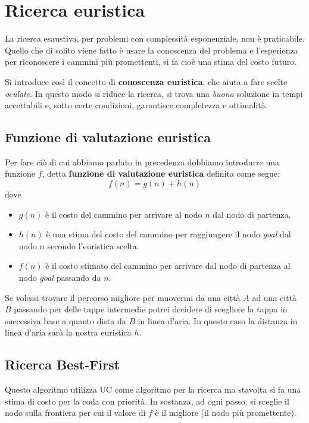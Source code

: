 \chapter{Ricerca euristica} \label{chapter: euristica}
La ricerca esaustiva, per problemi con complessit\`a esponenziale, non \`e praticabile.
Quello che di solito viene fatto \`e usare la conoscenza del problema e l'esperienza
per riconoscere i cammini pi\`u promettenti, si fa cio\`e una stima del costo futuro.

Si introduce cos\`i il concetto di \textbf{conoscenza euristica}, che aiuta a fare scelte
\emph{oculate}. In questo modo si riduce la ricerca, si trova una \emph{buona} soluzione
in tempi accettabili e, sotto certe condizioni, garantisce completezza e ottimalit\`a.

\section{Funzione di valutazione euristica}
Per fare ci\`o di cui abbiamo parlato in precedenza dobbiamo introdurre una funzione
$f$, detta \textbf{funzione di valutazione euristica} definita come segue:
\[ f(n) = g(n) + h(n) \]
dove
\begin{itemize}
	\item $g(n)$ \`e il costo del cammino per arrivare al nodo $n$ dal nodo di partenza.
	\item $h(n)$ \`e una stima del costo del cammino per raggiungere il nodo \emph{goal}
	      dal nodo $n$ secondo l'euristica scelta.
	\item $f(n)$ \`e il costo stimato del cammino per arrivare dal nodo di partenza
	      al nodo \emph{goal} passando da $n$.
\end{itemize}

\begin{example}
	Se volessi trovare il percorso migliore per muovermi da una citt\`a $A$ ad una
	citt\`a $B$ passando per delle tappe intermedie potrei decidere di scegliere la tappa in
	successiva base a quanto dista da $B$ in linea d'aria. In questo caso la distanza in linea
	d'aria sar\`a la nostra euristica $h$.
\end{example}

\section{Ricerca Best-First}
Questo algoritmo utilizza UC come algoritmo per la ricerca ma stavolta si fa una stima di
costo per la coda con priorit\`a. In sostanza, ad ogni passo, si sceglie il nodo sulla
frontiera per cui il valore di $f$ \`e il migliore (il nodo pi\`u promettente).

